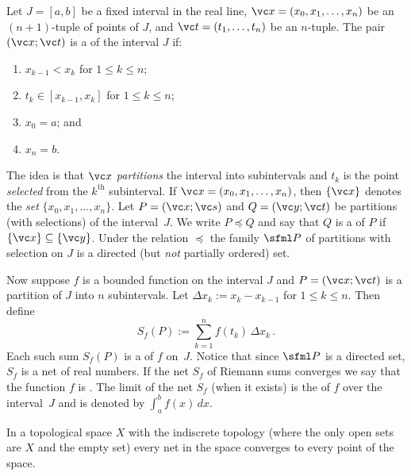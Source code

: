 \begin{exam}\label{C031437} Let $J = [a,b]$ be a fixed interval in the real line,
$\vc x = (x_0,x_1,\dots,x_n)$ be an $(n+1)$-tuple of points of $J$, and $\vc t =
(t_1,\dots,t_n)$ be an $n$-tuple. The pair $(\vc x;\vc t)$ is a
 of the interval $J$ if:
 \begin{enumerate}
  \item $x_{k-1} < x_k$ for $1 \le k \le n$;
  \item $t_k \in [x_{k-1},x_k]$ for $1 \le k \le n$;
  \item $x_0 = a$; and
  \item $x_n = b$.
 \end{enumerate}
The idea is that $\vc x$ \emph{partitions} the interval into subintervals and $t_k$ is
the point \emph{selected} from the $k^{\text{th}}$ subinterval.  If $\vc x =
(x_0,x_1,\dots,x_n)$, then $\{\vc x\}$ denotes the \emph{set} $\{x_0,x_1,\dots,x_n\}$.
Let $P = (\vc x;\vc s)$ and $Q = (\vc y;\vc t)$ be partitions (with selections) of the
interval~$J$. We write $P \preccurlyeq Q$ and say that $Q$ is a
 of $P$ if $\{\vc x\} \subseteq \{\vc y\}$. Under the relation
$\preccurlyeq$ the family $\sfml P$ of partitions with selection on $J$ is a directed
(but \emph{not} partially ordered) set.

Now suppose $f$ is a bounded function on the interval $J$ and $P = (\vc x;\vc t)$ is a
partition of $J$ into $n$ subintervals. Let $\Delta x_k := x_k - x_{k-1}$ for $1 \le k
\le n$. Then define
   \[ S_f(P) := \sum_{k=1}^n f(t_k)\,\Delta x_k\,. \]
Each such sum $S_f(P)$ is a
 of $f$ on~$J$. Notice that since $\sfml P$ is a directed set, $S_f$ is a
net of real numbers.  If the net $S_f$ of Riemann sums converges we say that the function
$f$ is
.  The limit of the net $S_f$ (when it exists) is the
 of $f$ over the interval~$J$ and is denoted by $\int_a^b f(x)\,dx$.
\end{exam}

\begin{exam}\label{exam_net_indiscrete} In a topological space $X$ with the
indiscrete topology (where the only open sets are $X$ and the empty set) every net in the space
converges to every point of the space.
\end{exam}

